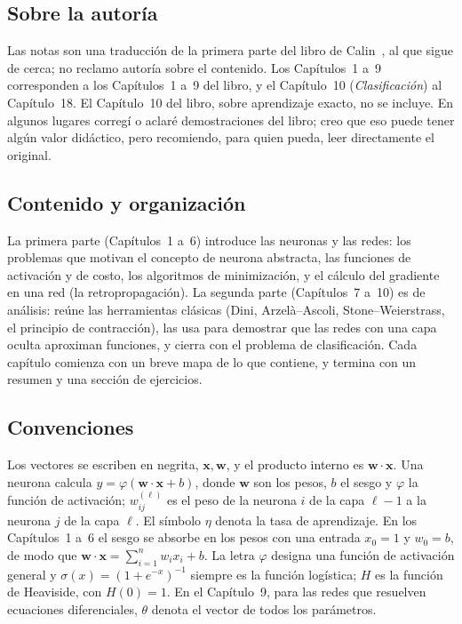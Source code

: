 \documentclass[12pt, a4paper]{amsbook}
\newcommand{\ww}{{\mathbf w}}
\newcommand{\xx}{{\mathbf x}}
\theoremstyle{remark}
\theoremstyle{definition}
\numberwithin{section}{chapter}
\numberwithin{subsection}{section}
\numberwithin{equation}{section}
\numberwithin{figure}{chapter}
\begin{document}
\subsection*{Sobre la autoría}

Las notas son una traducción de la primera parte del libro de Calin~\cite{Calin},
al que sigue de cerca; no reclamo autoría sobre el contenido. Los Capítulos~1
a~9 corresponden a los Capítulos~1 a~9 del libro, y el Capítulo~10
(\emph{Clasificación}) al Capítulo~18. El Capítulo~10 del libro, sobre
aprendizaje exacto, no se incluye. En algunos lugares corregí o aclaré
demostraciones del libro; creo que eso puede tener algún valor didáctico, pero
recomiendo, para quien pueda, leer directamente el original.

\subsection*{Contenido y organización}

La primera parte (Capítulos~1 a~6) introduce las neuronas y las redes: los
problemas que motivan el concepto de neurona abstracta, las funciones de
activación y de costo, los algoritmos de minimización, y el cálculo del
gradiente en una red (la retropropagación). La segunda parte (Capítulos~7 a~10)
es de análisis: reúne las herramientas clásicas (Dini, Arzelà--Ascoli,
Stone--Weierstrass, el principio de contracción), las usa para demostrar que
las redes con una capa oculta aproximan funciones, y cierra con el problema de
clasificación. Cada capítulo comienza con un breve mapa de lo que contiene, y
termina con un resumen y una sección de ejercicios.

\subsection*{Convenciones}

Los vectores se escriben en negrita, $\xx,\ww$, y el producto interno es
$\ww\cdot\xx$. Una neurona calcula $y=\varphi(\ww\cdot\xx+b)$, donde $\ww$ son
los pesos, $b$ el sesgo y $\varphi$ la función de activación; $w_{ij}^{(\ell)}$
es el peso de la neurona $i$ de la capa $\ell-1$ a la neurona $j$ de la capa
$\ell$. El símbolo $\eta$ denota la tasa de aprendizaje. En los
Capítulos~1 a~6 el sesgo se absorbe en los pesos con una entrada
$x_0=1$ y $w_0=b$, de modo que $\ww\cdot\xx=\sum_{i=1}^n w_ix_i+b$. La letra $\varphi$ designa una función de activación general y $\sigma(x)=(1+e^{-x})^{-1}$ siempre es la función logística; $H$ es la función de Heaviside, con $H(0)=1$. En el Capítulo~9, para las redes que resuelven ecuaciones diferenciales, $\theta$ denota el vector de todos los parámetros.
\end{document}

